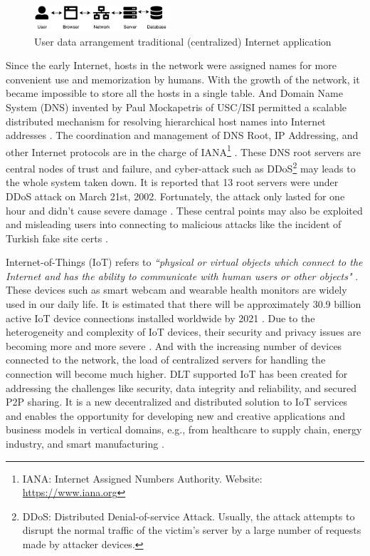 \begin{figure}[h]
    \includegraphics[width=0.45\textwidth,trim={-1cm -1cm 0.25cm -0.5cm},clip]{figs/traditional_internet.pdf}
    \caption{User data arrangement traditional (centralized) Internet application}
    \label{fig:traditional_internet}
\end{figure}

Since the early Internet, hosts in the network were assigned names for more convenient use and memorization by humans. With the growth of the network, it became impossible to store all the hosts in a single table.
And Domain Name System (DNS) invented by Paul Mockapetris of USC/ISI permitted a scalable distributed mechanism for resolving hierarchical host names into Internet addresses \cite{leiner2009brief}.
The coordination and management of DNS Root, IP Addressing, and other Internet protocols are in the charge of IANA\footnote{IANA: Internet Assigned Numbers Authority. Website: \url{https://www.iana.org}} \cite{Postel1994DomainNS}.
These DNS root servers are central nodes of trust and failure, and cyber-attack such as DDoS\footnote{DDoS: Distributed Denial-of-service Attack.
    Usually, the attack attempts to disrupt the normal traffic of the victim's server by a large number of requests made by attacker devices.} may leads to the whole system taken down.
It is reported that 13 root servers were under DDoS attack on March 21st, 2002. Fortunately, the attack only lasted for one hour and didn't cause severe damage \cite{mcguire2002attack}.
These central points may also be exploited and misleading users into connecting to malicious attacks like the incident of Turkish fake site certs \cite{rosenblatt_2013}.


Internet-of-Things (IoT) refers to \textit{``physical or virtual objects which connect to the Internet and has the ability to communicate with human users or other objects"} \cite{6978614}.
These devices such as smart webcam and wearable health monitors are widely used in our daily life.
It is estimated that there will be approximately 30.9 billion active IoT device connections installed worldwide by 2021 \cite{statista_2021}.
Due to the heterogeneity and complexity of IoT devices, their security and privacy issues are becoming more and more severe \cite{6978614}.
And with the increasing number of devices connected to the network, the load of centralized servers for handling the connection will become much higher.
DLT supported IoT has been created for addressing the challenges like security, data integrity and reliability, and secured P2P sharing.
It is a new decentralized and distributed solution to IoT services and enables the opportunity for developing new and creative applications and business models in vertical domains, e.g., from healthcare to supply chain, energy industry, and smart manufacturing \cite{Farahani2020TheCO}.


